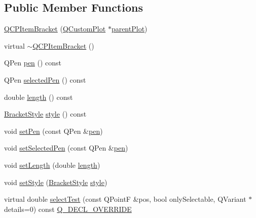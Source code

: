 \subsection*{Public Member Functions}
\begin{DoxyCompactItemize}
\item 
\hyperlink{class_q_c_p_item_bracket_a44ecfa37a76de5e3549e2d61f9d8ee56}{Q\+C\+P\+Item\+Bracket} (\hyperlink{class_q_custom_plot}{Q\+Custom\+Plot} $\ast$\hyperlink{class_q_c_p_layerable_a473edb813a4c1929d6b6a8fe3ff3faf7}{parent\+Plot})
\item 
virtual \hyperlink{class_q_c_p_item_bracket_ad773c3e8e09868d6f8caeb92c54919f4}{$\sim$\+Q\+C\+P\+Item\+Bracket} ()
\item 
Q\+Pen \hyperlink{class_q_c_p_item_bracket_a6013b3f83aab7bc82b485ee5447ecb1b}{pen} () const
\item 
Q\+Pen \hyperlink{class_q_c_p_item_bracket_aff5318a5415b87d9753c84752c65dd14}{selected\+Pen} () const
\item 
double \hyperlink{class_q_c_p_item_bracket_af69dbe7ca5847f36403e1fb502e8e59d}{length} () const
\item 
\hyperlink{class_q_c_p_item_bracket_a7ac3afd0b24a607054e7212047d59dbd}{Bracket\+Style} \hyperlink{class_q_c_p_item_bracket_a600ad8c0a3193cc2f335db6039f2932d}{style} () const
\item 
void \hyperlink{class_q_c_p_item_bracket_ab13001d9cc5d8f9e56ea15bdda682acb}{set\+Pen} (const Q\+Pen \&\hyperlink{class_q_c_p_item_bracket_a6013b3f83aab7bc82b485ee5447ecb1b}{pen})
\item 
void \hyperlink{class_q_c_p_item_bracket_a349785c31122778a520c64891fa204c5}{set\+Selected\+Pen} (const Q\+Pen \&\hyperlink{class_q_c_p_item_bracket_a6013b3f83aab7bc82b485ee5447ecb1b}{pen})
\item 
void \hyperlink{class_q_c_p_item_bracket_ac7cfc3da7da9b5c5ac5dfbe4f0351b2a}{set\+Length} (double \hyperlink{class_q_c_p_item_bracket_af69dbe7ca5847f36403e1fb502e8e59d}{length})
\item 
void \hyperlink{class_q_c_p_item_bracket_a612dffa2373422eef8754d690add3703}{set\+Style} (\hyperlink{class_q_c_p_item_bracket_a7ac3afd0b24a607054e7212047d59dbd}{Bracket\+Style} \hyperlink{class_q_c_p_item_bracket_a600ad8c0a3193cc2f335db6039f2932d}{style})
\item 
virtual double \hyperlink{class_q_c_p_item_bracket_a49a6b2f41e0a8c2a2e3a2836027a8455}{select\+Test} (const Q\+PointF \&pos, bool only\+Selectable, Q\+Variant $\ast$details=0) const \hyperlink{qcustomplot_8h_a42cc5eaeb25b85f8b52d2a4b94c56f55}{Q\+\_\+\+D\+E\+C\+L\+\_\+\+O\+V\+E\+R\+R\+I\+DE}
\end{DoxyCompactItemize}
